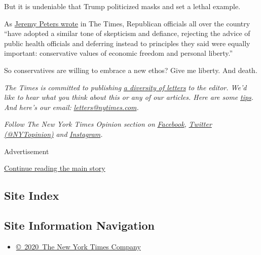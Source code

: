But it is undeniable that Trump politicized masks and set a lethal
example.

As
\href{https://www.nytimes.com/2020/07/30/us/politics/herman-cain-gop-coronavirus.html}{Jeremy
Peters wrote} in The Times, Republican officials all over the country
``have adopted a similar tone of skepticism and defiance, rejecting the
advice of public health officials and deferring instead to principles
they said were equally important: conservative values of economic
freedom and personal liberty.''

So conservatives are willing to embrace a new ethos? Give me liberty.
And death.

\emph{The Times is committed to publishing}
\href{https://www.nytimes.com/2019/01/31/opinion/letters/letters-to-editor-new-york-times-women.html}{\emph{a
diversity of letters}} \emph{to the editor. We'd like to hear what you
think about this or any of our articles. Here are some}
\href{https://help.nytimes.com/hc/en-us/articles/115014925288-How-to-submit-a-letter-to-the-editor}{\emph{tips}}\emph{.
And here's our email:}
\href{mailto:letters@nytimes.com}{\emph{letters@nytimes.com}}\emph{.}

\emph{Follow The New York Times Opinion section on}
\href{https://www.facebook.com/nytopinion}{\emph{Facebook}}\emph{,}
\href{http://twitter.com/NYTOpinion}{\emph{Twitter (@NYTopinion)}}
\emph{and}
\href{https://www.instagram.com/nytopinion/}{\emph{Instagram}}\emph{.}

Advertisement

\protect\hyperlink{after-bottom}{Continue reading the main story}

\hypertarget{site-index}{%
\subsection{Site Index}\label{site-index}}

\hypertarget{site-information-navigation}{%
\subsection{Site Information
Navigation}\label{site-information-navigation}}

\begin{itemize}
\tightlist
\item
  \href{https://help.nytimes.com/hc/en-us/articles/115014792127-Copyright-notice}{©~2020~The
  New York Times Company}
\end{itemize}

